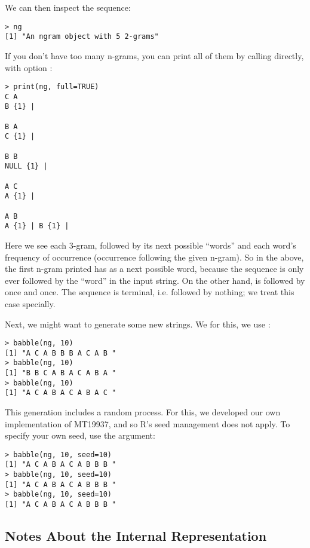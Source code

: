 We can then inspect the sequence:

\begin{lstlisting}[language=rr]
> ng
[1] "An ngram object with 5 2-grams"
\end{lstlisting}

If you don't have too many n-grams, you can print all of them by calling 
 directly, with option :
\begin{lstlisting}[language=rr]
> print(ng, full=TRUE)
C A 
B {1} | 

B A 
C {1} | 

B B 
NULL {1} | 

A C 
A {1} | 

A B 
A {1} | B {1} | 
\end{lstlisting}

Here we see each 3-gram, followed by its next possible ``words'' and each 
word's frequency of occurrence (occurrence following the given n-gram).  So in 
the above, the first n-gram printed  has  as a next 
possible word, because the sequence  is only ever followed by the 
``word''  in the input string.  On the other hand,  is 
followed by  once and  once.  The sequence  is 
terminal, i.e. followed by nothing; we treat this case specially.

Next, we might want to generate some new strings.  We for this, we use 
:

\begin{lstlisting}[language=rr]
> babble(ng, 10)
[1] "A C A B B B A C A B "
> babble(ng, 10)
[1] "B B C A B A C A B A "
> babble(ng, 10)
[1] "A C A B A C A B A C "
\end{lstlisting}

This generation includes a random process.  For this, we developed our own 
implementation of MT19937, and so R's seed management does not apply.  To 
specify your own seed, use the  argument:
\begin{lstlisting}[language=rr]
> babble(ng, 10, seed=10)
[1] "A C A B A C A B B B "
> babble(ng, 10, seed=10)
[1] "A C A B A C A B B B "
> babble(ng, 10, seed=10)
[1] "A C A B A C A B B B "
\end{lstlisting}



\subsection{Notes About the Internal Representation}

